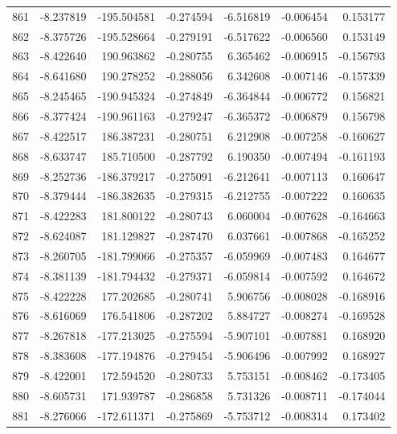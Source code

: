 \begin{tabular}{rrrrrrr}
 861 &  -8.237819 & -195.504581 & -0.274594 &  -6.516819 &  -0.006454 &  0.153177 \\
 862 &  -8.375726 & -195.528664 & -0.279191 &  -6.517622 &  -0.006560 &  0.153149 \\
 863 &  -8.422640 &  190.963862 & -0.280755 &   6.365462 &  -0.006915 & -0.156793 \\
 864 &  -8.641680 &  190.278252 & -0.288056 &   6.342608 &  -0.007146 & -0.157339 \\
 865 &  -8.245465 & -190.945324 & -0.274849 &  -6.364844 &  -0.006772 &  0.156821 \\
 866 &  -8.377424 & -190.961163 & -0.279247 &  -6.365372 &  -0.006879 &  0.156798 \\
 867 &  -8.422517 &  186.387231 & -0.280751 &   6.212908 &  -0.007258 & -0.160627 \\
 868 &  -8.633747 &  185.710500 & -0.287792 &   6.190350 &  -0.007494 & -0.161193 \\
 869 &  -8.252736 & -186.379217 & -0.275091 &  -6.212641 &  -0.007113 &  0.160647 \\
 870 &  -8.379444 & -186.382635 & -0.279315 &  -6.212755 &  -0.007222 &  0.160635 \\
 871 &  -8.422283 &  181.800122 & -0.280743 &   6.060004 &  -0.007628 & -0.164663 \\
 872 &  -8.624087 &  181.129827 & -0.287470 &   6.037661 &  -0.007868 & -0.165252 \\
 873 &  -8.260705 & -181.799066 & -0.275357 &  -6.059969 &  -0.007483 &  0.164677 \\
 874 &  -8.381139 & -181.794432 & -0.279371 &  -6.059814 &  -0.007592 &  0.164672 \\
 875 &  -8.422228 &  177.202685 & -0.280741 &   5.906756 &  -0.008028 & -0.168916 \\
 876 &  -8.616069 &  176.541806 & -0.287202 &   5.884727 &  -0.008274 & -0.169528 \\
 877 &  -8.267818 & -177.213025 & -0.275594 &  -5.907101 &  -0.007881 &  0.168920 \\
 878 &  -8.383608 & -177.194876 & -0.279454 &  -5.906496 &  -0.007992 &  0.168927 \\
 879 &  -8.422001 &  172.594520 & -0.280733 &   5.753151 &  -0.008462 & -0.173405 \\
 880 &  -8.605731 &  171.939787 & -0.286858 &   5.731326 &  -0.008711 & -0.174044 \\
 881 &  -8.276066 & -172.611371 & -0.275869 &  -5.753712 &  -0.008314 &  0.173402 \\

\end{tabular}
